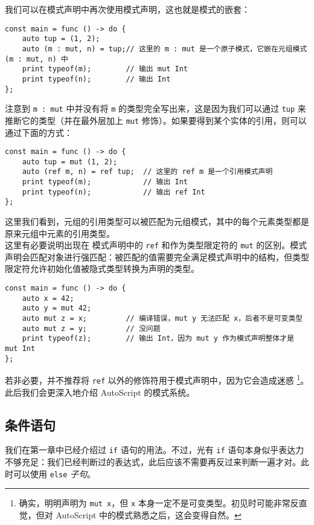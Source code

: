 我们可以在模式声明中再次使用模式声明，这也就是模式的嵌套：

\begin{lstlisting}
const main = func () -> do {
    auto tup = (1, 2);
    auto (m : mut, n) = tup;// 这里的 m : mut 是一个原子模式，它嵌在元组模式 (m : mut, n) 中
    print typeof(m);        // 输出 mut Int
    print typeof(n);        // 输出 Int
};
\end{lstlisting}

注意到 \lstinline!m : mut! 中并没有将 \lstinline!m! 的类型完全写出来，这是因为我们可以通过 \lstinline!tup! 来推断它的类型（并在最外层加上 \lstinline!mut! 修饰）。如果要得到某个实体的引用，则可以通过下面的方式：

\begin{lstlisting}
const main = func () -> do {
    auto tup = mut (1, 2);
    auto (ref m, n) = ref tup;  // 这里的 ref m 是一个引用模式声明
    print typeof(m);            // 输出 Int
    print typeof(n);            // 输出 ref Int
};
\end{lstlisting}

这里我们看到，元组的引用类型可以被匹配为元组模式，其中的每个元素类型都是原来元组中元素的引用类型。 \\

这里有必要说明出现在 模式声明中的 \lstinline!ref! 和作为类型限定符的 \lstinline!mut! 的区别。模式声明会匹配对象进行强匹配：被匹配的值需要完全满足模式声明中的结构，但类型限定符允许初始化值被隐式类型转换为声明的类型。

\begin{lstlisting}
const main = func () -> do {
    auto x = 42;
    auto y = mut 42;
    auto mut z = x;         // 编译错误，mut y 无法匹配 x，后者不是可变类型
    auto mut z = y;         // 没问题
    print typeof(z);        // 输出 Int，因为 mut y 作为模式声明整体才是 mut Int
};
\end{lstlisting}

若非必要，并不推荐将 \lstinline!ref! 以外的修饰符用于模式声明中，因为它会造成迷惑 \footnote{确实，明明声明为 \lstinline!mut x!，但 \lstinline!x! 本身一定不是可变类型。初见时可能非常反直觉，但对 AutoScript 中的模式熟悉之后，这会变得自然。}。此后我们会更深入地介绍 AutoScript 的模式系统。

\subsection{条件语句}

我们在第一章中已经介绍过 \lstinline!if! 语句的用法。不过，光有 \lstinline!if! 语句本身似乎表达力不够充足：我们已经判断过的表达式，此后应该不需要再反过来判断一遍才对。此时可以使用 \lstinline!else! \emph{子句}。

